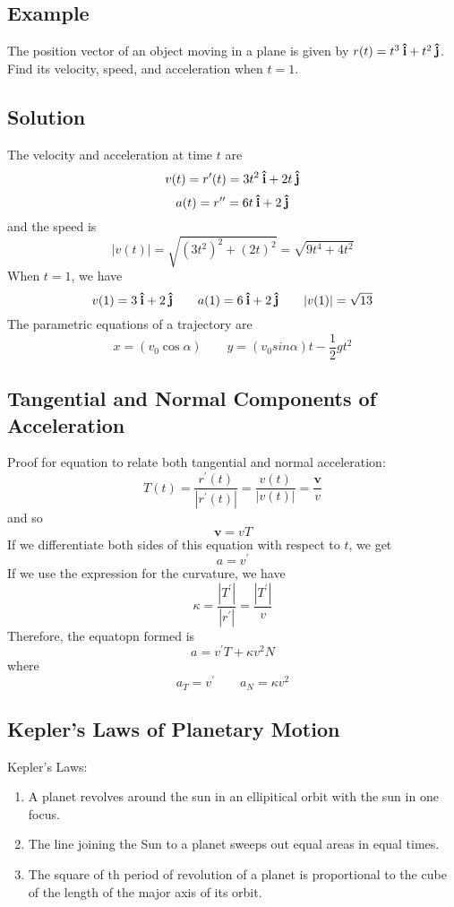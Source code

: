 \subsection*{Example}
The position vector of an object moving in a plane is given by $r(t) = t^3\:\boldsymbol{\hat{\textbf{i}}} + t^2\:\boldsymbol{\hat{\textbf{j}}}$. Find its velocity, speed, and acceleration when $t = 1$.
\subsection*{Solution}
The velocity and acceleration at time $t$ are $$v(t) = r^\prime(t) = 3t^2\:\boldsymbol{\hat{\textbf{i}}} + 2t\:\boldsymbol{\hat{\textbf{j}}}$$
$$a(t) = r^{\prime\prime} = 6t\:\boldsymbol{\hat{\textbf{i}}} + 2\:\boldsymbol{\hat{\textbf{j}}}$$ and the speed is $$|v(t)| = \sqrt{(3t^2)^2 + (2t)^2} = \sqrt{9t^4 + 4t^2}$$
When $t = 1$, we have $$v(1) = 3\:\boldsymbol{\hat{\textbf{i}}} + 2\:\boldsymbol{\hat{\textbf{j}}}\qquad a(1) = 6\:\boldsymbol{\hat{\textbf{i}}} + 2\:\boldsymbol{\hat{\textbf{j}}}\qquad |v(1)| = \sqrt{13}$$
The parametric equations of a trajectory are $$x = (v_0\cos\alpha)\qquad y = (v_0sin\alpha)t -\frac{1}{2}gt^2$$
\subsection*{Tangential and Normal Components of Acceleration}
Proof for equation to relate both tangential and normal acceleration: 
$$T(t) = \frac{r^\prime(t)}{|r^\prime(t)|} = \frac{v(t)}{|v(t)|} = \frac{\textbf{v}}{v}$$ and so $$\textbf{v} = vT$$
If we differentiate both sides of this equation with respect to $t$, we get 
$$a = v^\prime$$ If we use the expression for the curvature, we have $$\kappa = \frac{|T^\prime|}{|r^\prime|} = \frac{|T^\prime|}{v}$$
Therefore, the equatopn formed is 
$$a = v^\prime T + \kappa v^2N$$ where $$a_T = v^\prime\qquad a_N = \kappa v^2$$
\subsection*{Kepler's Laws of Planetary Motion}
Kepler's Laws:
\begin{enumerate}
    \item A planet revolves around the sun in an ellipitical orbit with the sun in one focus.
    \item The line joining the Sun to a planet sweeps out equal areas in equal times. 
    \item The square of th period of revolution of a planet is proportional to the cube of the length of the major axis of its orbit.
\end{enumerate}